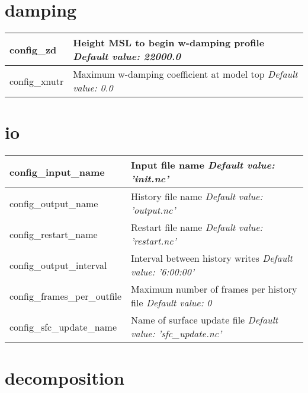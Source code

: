 \section{damping}

{\small
\begin{longtable}{|p{2.0in} |p{4.25in}|}
 \hline
   config\_zd & Height MSL to begin w-damping profile \newline 
   {\em Default value: 22000.0} \\ \hline

   config\_xnutr & Maximum w-damping coefficient at model top \newline 
   {\em Default value: 0.0} \\ \hline
\end{longtable}
}

\section{io}

{\small
\begin{longtable}{|p{2.0in} |p{4.25in}|}
 \hline
   config\_input\_name & Input file name \newline 
   {\em Default value: 'init.nc'} \\ \hline

   config\_output\_name & History file name \newline 
   {\em Default value: 'output.nc'} \\ \hline

   config\_restart\_name & Restart file name \newline 
   {\em Default value: 'restart.nc'} \\ \hline

   config\_output\_interval & Interval between history writes \newline 
   {\em Default value: '6:00:00'} \\ \hline

   config\_frames\_per\_outfile & Maximum number of frames per history file \newline 
   {\em Default value: 0} \\ \hline

   config\_sfc\_update\_name & Name of surface update file \newline 
   {\em Default value: 'sfc\_update.nc'} \\ \hline
\end{longtable}
}

\section{decomposition}

